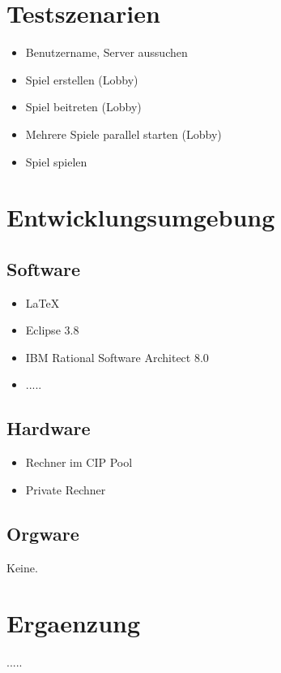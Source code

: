 \documentclass{article}
\begin{document}
\section{Testszenarien}
\begin{itemize}
	\item Benutzername, Server aussuchen
	\item Spiel erstellen (Lobby)
	\item Spiel beitreten (Lobby)
	\item Mehrere Spiele parallel starten (Lobby)
	\item Spiel spielen 
\end{itemize}

\section{Entwicklungsumgebung}
\subsection{Software}
\begin{itemize}
	\item LaTeX
	\item Eclipse 3.8
	\item IBM Rational Software Architect 8.0
	\item .....
\end{itemize}

\subsection{Hardware}
\begin{itemize}
	\item Rechner im CIP Pool	
	\item Private Rechner
\end{itemize}

\subsection{Orgware}
Keine.

\section{Ergaenzung}
..... 
\newpage
\printglossaries
\end{document}
